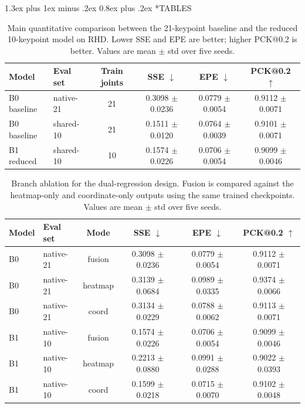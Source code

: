 \documentclass[10pt,letterpaper,twocolumn]{article}
\makeatletter
\renewcommand\section{\@startsection{section}{1}{\z@}%
  {1.3ex plus 1ex minus .2ex}%
  {0.8ex plus .2ex}%
  {\centering\normalfont\small\scshape}}
\makeatother
\begin{document}
\clearpage
\onecolumn
\section*{TABLES}

\begin{table}[H]
\centering
\footnotesize
\caption{Main quantitative comparison between the 21-keypoint baseline and the reduced 10-keypoint model on RHD. Lower SSE and EPE are better; higher PCK@0.2 is better. Values are mean $\pm$ std over five seeds.}
\label{tab:main_accuracy}
\begin{tabular}{llcccc}
\toprule
Model & Eval set & Train joints & SSE $\downarrow$ & EPE $\downarrow$ & PCK@0.2 $\uparrow$ \\
\midrule
B0 baseline & native-21 & 21 & 0.3098 $\pm$ 0.0236 & 0.0779 $\pm$ 0.0054 & 0.9112 $\pm$ 0.0071 \\
B0 baseline & shared-10 & 21 & 0.1511 $\pm$ 0.0120 & 0.0764 $\pm$ 0.0039 & 0.9101 $\pm$ 0.0071 \\
B1 reduced & shared-10 & 10 & 0.1574 $\pm$ 0.0226 & 0.0706 $\pm$ 0.0054 & 0.9099 $\pm$ 0.0046 \\
\bottomrule
\end{tabular}
\end{table}

\begin{table}[H]
\centering
\footnotesize
\caption{Branch ablation for the dual-regression design. Fusion is compared against the heatmap-only and coordinate-only outputs using the same trained checkpoints. Values are mean $\pm$ std over five seeds.}
\label{tab:branch_ablation}
\begin{tabular}{llcccc}
\toprule
Model & Eval set & Mode & SSE $\downarrow$ & EPE $\downarrow$ & PCK@0.2 $\uparrow$ \\
\midrule
B0 & native-21 & fusion & 0.3098 $\pm$ 0.0236 & 0.0779 $\pm$ 0.0054 & 0.9112 $\pm$ 0.0071 \\
B0 & native-21 & heatmap & 0.3139 $\pm$ 0.0684 & 0.0989 $\pm$ 0.0335 & 0.9374 $\pm$ 0.0066 \\
B0 & native-21 & coord & 0.3134 $\pm$ 0.0229 & 0.0788 $\pm$ 0.0062 & 0.9113 $\pm$ 0.0071 \\
B1 & native-10 & fusion & 0.1574 $\pm$ 0.0226 & 0.0706 $\pm$ 0.0054 & 0.9099 $\pm$ 0.0046 \\
B1 & native-10 & heatmap & 0.2213 $\pm$ 0.0880 & 0.0991 $\pm$ 0.0288 & 0.9022 $\pm$ 0.0393 \\
B1 & native-10 & coord & 0.1599 $\pm$ 0.0218 & 0.0715 $\pm$ 0.0070 & 0.9102 $\pm$ 0.0048 \\
\bottomrule
\end{tabular}
\end{table}
\end{document}
